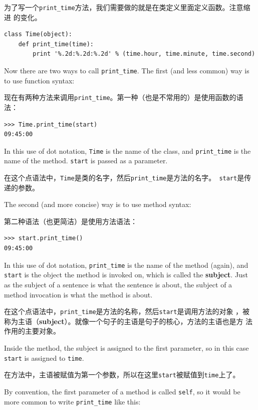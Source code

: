 \documentclass[10pt]{book}
\begin{document}
\begin{CJK}{UTF8}{gbsn}
为了写一个\verb"print_time"方法，我们需要做的就是在类定义里面定义函数。注意缩进
的变化。

\begin{verbatim}
class Time(object):
    def print_time(time):
        print '%.2d:%.2d:%.2d' % (time.hour, time.minute, time.second)
\end{verbatim}
%
Now there are two ways to call \verb"print_time".  The first
(and less common) way is to use function syntax:

现在有两种方法来调用\verb"print_time"。第一种（也是不常用的）是使用函数的语法：


\begin{verbatim}
>>> Time.print_time(start)
09:45:00
\end{verbatim}
%
In this use of dot notation, {\tt Time} is the name of the class,
and \verb"print_time" is the name of the method.  {\tt start} is
passed as a parameter.

在这个点语法中，{\tt Time}是类的名字，然后\verb"print_time"是方法的名字。{\tt
start}是传递的参数。

The second (and more concise) way is to use method syntax:

第二种语法（也更简洁）是使用方法语法：

\begin{verbatim}
>>> start.print_time()
09:45:00
\end{verbatim}
%
In this use of dot notation, \verb"print_time" is the name of the
method (again), and {\tt start} is the object the method is
invoked on, which is called the {\bf subject}.  Just as the
subject of a sentence is what the sentence is about, the subject
of a method invocation is what the method is about.

在这个点语法中，\verb"print_time"是方法的名称，然后{\tt start}是调用方法的对象
，被称为主语（{\bf subject}）。就像一个句子的主语是句子的核心，方法的主语也是方
法作用的主要对象。

Inside the method, the subject is assigned to the first
parameter, so in this case {\tt start} is assigned
to {\tt time}.

在方法中，主语被赋值为第一个参数，所以在这里{\tt start}被赋值到{\tt time}上了。

By convention, the first parameter of a method is
called {\tt self}, so it would be more common to write
\verb"print_time" like this:


\end{CJK}
\end{document}
